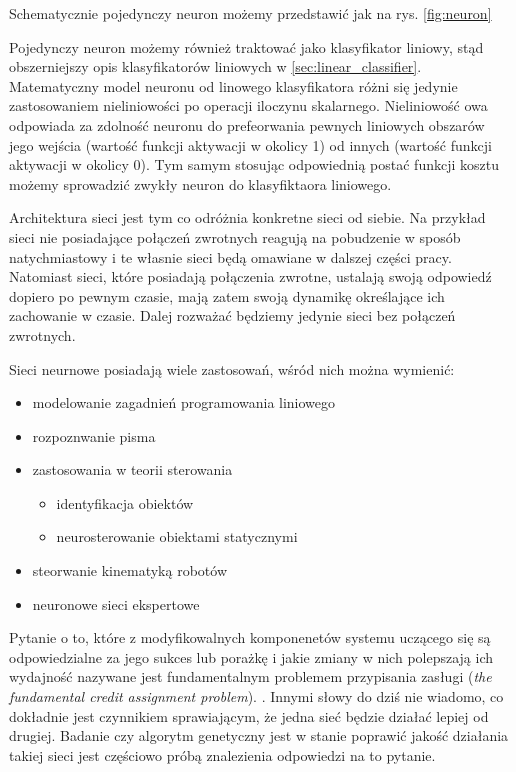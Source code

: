 Schematycznie pojedynczy neuron możemy przedstawić jak na rys. \ref{fig:neuron}

Pojedynczy neuron możemy również traktować jako klasyfikator liniowy, stąd obszerniejszy opis klasyfikatorów liniowych w \ref{sec:linear_classifier}.
Matematyczny model neuronu od linowego klasyfikatora różni się jedynie zastosowaniem nieliniowości po operacji iloczynu skalarnego.
Nieliniowość owa odpowiada za zdolność neuronu do prefeorwania pewnych liniowych obszarów jego wejścia (wartość funkcji aktywacji w okolicy 1) od innych (wartość funkcji aktywacji w okolicy 0).
Tym samym stosując odpowiednią postać funkcji kosztu możemy sprowadzić zwykły neuron do klasyfiktaora liniowego. \cite{cs231n}

Architektura sieci jest tym co odróżnia konkretne sieci od siebie.
Na przykład sieci nie posiadające połączeń zwrotnych reagują na pobudzenie w sposób natychmiastowy i te własnie sieci będą omawiane w dalszej części pracy.
Natomiast sieci, które posiadają połączenia zwrotne, ustalają swoją odpowiedź dopiero po pewnym czasie, mają zatem swoją dynamikę określające ich zachowanie w czasie. \cite{zuradabarskijedruch1996}
Dalej rozważać będziemy jedynie sieci bez połączeń zwrotnych.

Sieci neurnowe posiadają wiele zastosowań, wśród nich można wymienić:
\begin{itemize}
	\item modelowanie zagadnień programowania liniowego
	\item rozpoznwanie pisma
	\item zastosowania w teorii sterowania
	\begin{itemize}
		\item identyfikacja obiektów
		\item neurosterowanie obiektami statycznymi
	\end{itemize}
	\item steorwanie kinematyką robotów
	\item neuronowe sieci ekspertowe \cite{zuradabarskijedruch1996}
\end{itemize}

Pytanie o to, które z modyfikowalnych komponenetów systemu uczącego się są odpowiedzialne za jego sukces lub porażkę i jakie zmiany w nich polepszają ich wydajność nazywane jest fundamentalnym problemem przypisania zasługi (\textit{the fundamental credit assignment problem}). \cite{SCHMIDHUBER201585}.
Innymi słowy do dziś nie wiadomo, co dokładnie jest czynnikiem sprawiającym, że jedna sieć będzie działać lepiej od drugiej.
Badanie czy algorytm genetyczny jest w stanie poprawić jakość działania takiej sieci jest częściowo próbą znalezienia odpowiedzi na to pytanie.

